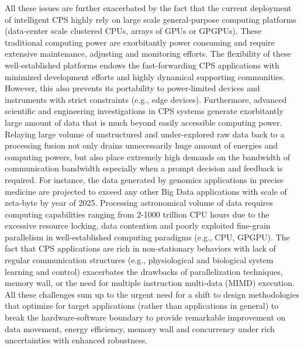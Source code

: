 All these issues are further exacerbated by the fact that the current deployment of intelligent CPS highly rely on large scale general-purpose computing platforms (data-center scale clustered CPUs, arrays of GPUs or GPGPUs). These traditional computing power are exorbitantly power consuming and require extensive maintenance, adjusting and monitoring efforts. The flexibility of these well-established platforms endows the fast-forwarding CPS applications with minimized development efforts and highly dynamical supporting communities. However, this also prevents its portability to power-limited devices and instruments with strict constraints (e.g., edge devices). Furthermore, advanced scientific and engineering investigations in CPS systems generate exorbitantly large amount of data that is much beyond easily accessible computing power. Relaying large volume of unstructured and under-explored raw data back to a processing fusion not only drains unnecessarily huge amount of energies and computing powers, but also place extremely high demands on the bandwidth of communication bandwidth especially when a prompt decision and feedback is required. For instance, the data generated by genomics applications in precise medicine are projected to exceed any other Big Data applications with scale of zeta-byte by year of 2025. Processing astronomical volume of data requires computing capabilities ranging from 2-1000 trillion CPU hours due to the excessive resource locking, data contention and poorly exploited fine-grain parallelism in well-established computing paradigms (e.g., CPU, GPGPU). The fact that CPS applications are rich in non-stationary behaviors with lack of regular communication structures (e.g., physiological and biological system learning and control) exacerbates the drawbacks of parallelization techniques, memory wall, or the need for multiple instruction multi-data (MIMD) execution. All these challenges sum up to the urgent need for a shift to design methodologies that optimize for target applications (rather than applications in general) to break the hardware-software boundary to provide remarkable improvement on data movement, energy efficiency, memory wall and concurrency under rich uncertainties with enhanced robustness. 

